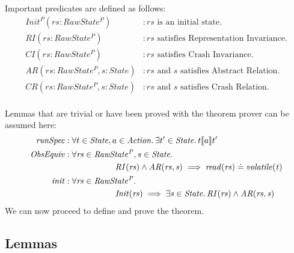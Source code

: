 \documentclass[a4paper,11pt]{article}
\theoremstyle{definition}
\begin{document}
Important predicates are defined as follows:
\begin{align*}
	\mathit{Init^P(rs : RawState^P)} &: \text{$\mathit{rs}$ is an initial state.}\\
	\mathit{RI(rs : RawState^P)} &: \text{$\mathit{rs}$ satisfies Representation Invariance.} \\
	\mathit{CI(rs : RawState^P)} &: \text{$\mathit{rs}$ satisfies Crash Invariance.} \\
	\mathit{AR(rs : RawState^P, s : State)} &: \text{$\mathit{rs}$ and $s$ satisfies Abstract Relation.} \\
	\mathit{CR(rs : RawState^P, s : State)} &: \text{$\mathit{rs}$ and $s$ satisfies Crash Relation.} \\
\end{align*}

Lemmas that are trivial or have been proved with the theorem prover can be assumed here:
\begin{align*}
	\mathit{runSpec} &: \forall t \in \mathit{State}, a \in \mathit{Action} \ldotp \exists t' \in \mathit{State} \ldotp t \llbracket a \rrbracket t'\\
	\mathit{ObsEquiv} &: \forall \mathit{rs} \in \mathit{RawState^P},s \in \mathit{State} \ldotp\\
	 &\qquad \qquad \qquad \mathit{RI(rs)} \land \mathit{AR(rs, s)} \implies \mathit{read(rs)} \doteq \mathit{volatile(t)}\\
	\mathit{init} &: \forall \mathit{rs} \in \mathit{RawState^P} \ldotp\\ 
	 &\qquad \qquad \qquad \mathit{Init(rs) \implies \exists s \in \mathit{State} \ldotp RI(rs) \land AR(rs, s)}
\end{align*}
We can now proceed to define and prove the theorem.


\subsection{Lemmas}
\end{document}
